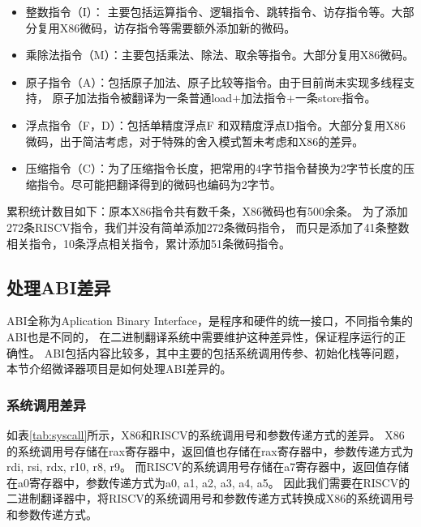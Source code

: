 \documentclass{Style/ucasproposal}%
\begin{document}
\begin{itemize}
  \item 整数指令（I）： 主要包括运算指令、逻辑指令、跳转指令、访存指令等。大部分复用X86微码，访存指令等需要额外添加新的微码。

  \item 乘除法指令（M）：主要包括乘法、除法、取余等指令。大部分复用X86微码。

  \item 原子指令（A）：包括原子加法、原子比较等指令。由于目前尚未实现多线程支持，
  原子加法指令被翻译为一条普通load+加法指令+一条store指令。

  \item 浮点指令（F，D）：包括单精度浮点F 和双精度浮点D指令。大部分复用X86微码，出于简洁考虑，对于特殊的舍入模式暂未考虑和X86的差异。

  \item 压缩指令（C）：为了压缩指令长度，把常用的4字节指令替换为2字节长度的压缩指令。尽可能把翻译得到的微码也编码为2字节。

\end{itemize}

累积统计数目如下：原本X86指令共有数千条，X86微码也有500余条。
为了添加272条RISCV指令，我们并没有简单添加272条微码指令，
而只是添加了41条整数相关指令，10条浮点相关指令，累计添加51条微码指令。

\subsection{处理ABI差异}
ABI全称为Aplication Binary Interface，是程序和硬件的统一接口，不同指令集的ABI也是不同的，
在二进制翻译系统中需要维护这种差异性，保证程序运行的正确性。
ABI包括内容比较多，其中主要的包括系统调用传参、初始化栈等问题，本节介绍微译器项目是如何处理ABI差异的。


\subsubsection{系统调用差异}

如表\ref{tab:syscall}所示，X86和RISCV的系统调用号和参数传递方式的差异。
X86的系统调用号存储在rax寄存器中，返回值也存储在rax寄存器中，参数传递方式为rdi, rsi, rdx, r10, r8, r9。
而RISCV的系统调用号存储在a7寄存器中，返回值存储在a0寄存器中，参数传递方式为a0, a1, a2, a3, a4, a5。
因此我们需要在RISCV的二进制翻译器中，将RISCV的系统调用号和参数传递方式转换成X86的系统调用号和参数传递方式。
\end{document}
